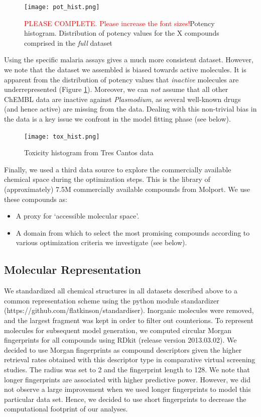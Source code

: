 \documentclass{article}
\begin{document}
\begin{figure}[h!]
\centering
\texttt{[image: pot\_hist.png]}
\caption{\textcolor{red}{PLEASE COMPLETE. Please increase the font sizes!}Potency histogram. Distribution of potency values for the X compounds comprised in the {\it full} dataset}
\label{fig:pothist}
\end{figure}

Using the specific malaria assays gives a much more consistent dataset.  However, we note that the dataset we assembled is biased towards active molecules. It is apparent from the distribution of potency values  that \textit{inactive} molecules are underrepresented (Figure \ref{fig:pothist}).  Moreover, we can \textit{not} assume that all other ChEMBL data are inactive against \textit{Plasmodium}, as several well-known drugs (and hence active) are missing from the data. Dealing with this non-trivial bias in the data is a key issue we confront in the model fitting phase (see below).\newline

\begin{figure}[h!]
\centering
\texttt{[image: tox\_hist.png]}
\caption{Toxicity histogram from Tres Cantos data}
\label{fig:toxhist}
\end{figure}

\newline
Finally, we used a third data source to explore the commercially available chemical space during the optimization steps.  This is the library of (approximately) 7.5M commercially available compounds from Molport.  We use these compounds as: \begin{itemize}
    \item A proxy for `accessible molecular space'.
    \item A domain from which to select the most promising compounds according to various optimization criteria we investigate (see below).
\end{itemize}


\subsection{Molecular Representation}
We standardized all chemical structures in all datasets described above to a common representation scheme using the python module standardizer (https://github.com/flatkinson/standardiser). Inorganic molecules were removed, and the largest fragment was kept in order to filter out counterions. 
To represent molecules for subsequent model generation, we computed circular Morgan fingerprints\cite{Rogers2010} for all compounds using RDkit (release version 2013.03.02)\cite{rdkit}. We decided to use Morgan fingerprints as compound descriptors given the higher retrieval rates obtained with this descriptor type in comparative virtual screening studies\cite{Koutsoukas2013}. The radius was set to 2 and the fingerprint length to 128. We note that longer fingerprints are associated with higher predictive power. However, we did not observe a large improvement when we used longer fingerprints to model this particular data set. Hence, we decided to use short fingerprints to decrease the computational footprint of our analyses. 
\end{document}
